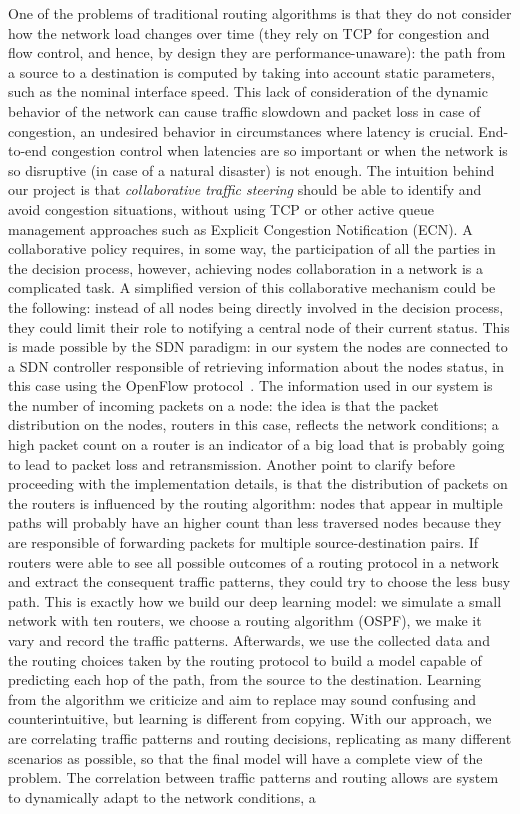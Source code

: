One of the problems of traditional routing algorithms is that they do not consider how the network load changes over time (they rely on TCP for congestion and flow control, and hence, by design they are performance-unaware): the path from a source to a destination is computed by taking into account static parameters, such as the nominal interface speed. This lack of consideration of the dynamic behavior of the network can cause traffic slowdown and packet loss in case of congestion, an undesired behavior in circumstances where latency is crucial. End-to-end congestion control when latencies are so important or when the network is so disruptive (in case of a natural disaster) is not enough. The intuition behind our project is that \textit{collaborative traffic steering} should be able to identify and avoid congestion situations, without using TCP or other active queue management approaches such as Explicit Congestion Notification (ECN). A collaborative policy requires, in some way, the participation of all the parties in the decision process, however, achieving nodes collaboration in a network is a complicated task. A simplified version of this collaborative mechanism could be the following: instead of all nodes being directly involved in the decision process, they could limit their role to notifying a central node of their current status. This is made possible by the SDN paradigm: in our system the nodes are connected to a SDN controller responsible of retrieving information about the nodes status, in this case using the OpenFlow protocol~\cite{openflow}. The information used in our system is the number of incoming packets on a node: the idea is that the packet distribution on the nodes, routers in this case, reflects the network conditions; a high packet count on a router is an indicator of a big load that is probably going to lead to packet loss and retransmission. Another point to clarify before proceeding with the implementation details, is that the distribution of packets on the routers is influenced by the routing algorithm: nodes that appear in multiple paths will probably have an higher count than less traversed nodes because they are responsible of forwarding packets for multiple source-destination pairs. If routers were able to see all possible outcomes of a routing protocol in a network and extract the consequent traffic patterns, they could try to choose the less busy path. This is exactly how we build our deep learning model: we simulate a small network with ten routers, we choose a routing algorithm (OSPF), we make it vary and record the traffic patterns. Afterwards, we use the collected data and the routing choices taken by the routing protocol to build a model capable of predicting each hop of the path, from the source to the destination. Learning from the algorithm we criticize and aim to replace may sound confusing and counterintuitive, but learning is different from copying. With our approach, we are correlating traffic patterns and routing decisions, replicating as many different scenarios as possible, so that the final model will have a complete view of the problem. The correlation between traffic patterns and routing allows are system to dynamically adapt to the network conditions, a 
